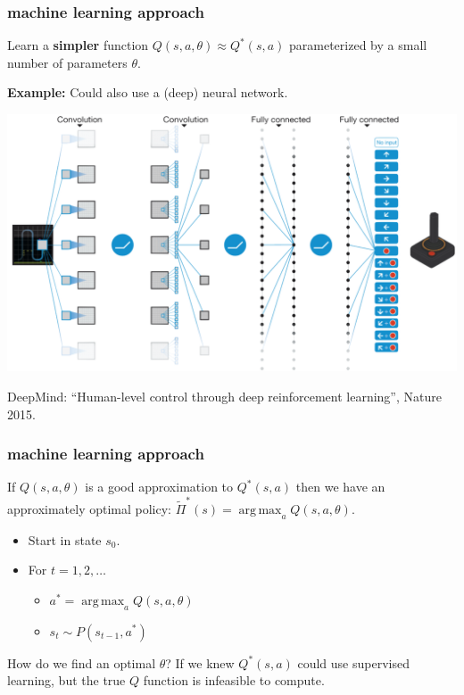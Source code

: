 \documentclass[handout,compress]{beamer}
\DeclareMathOperator*{\argmax}{arg\,max}
\begin{document}
\begin{frame}
	\frametitle{machine learning approach}
	Learn a \textbf{simpler} function $Q(s,a,{\theta}) \approx Q^*(s,a)$ parameterized by a small number of parameters ${\theta}$.  
	
	\textbf{Example:} Could also use a (deep) neural network. 
	\begin{center}
		\includegraphics[width=.7\textwidth]{atari_func_approx.png}
	\end{center}
DeepMind: ``Human-level control through deep reinforcement learning'', Nature 2015.
\end{frame}

\begin{frame}
	\frametitle{machine learning approach}
	If $Q(s,a,\theta)$ is a good approximation to $Q^*(s,a)$ then we have an approximately optimal policy: $\tilde{\Pi}^*(s) = \argmax_a Q(s,a, \theta)$.
	\begin{itemize}
		\item Start in state $s_0$. 
		\item For $t = 1, 2, \ldots$
		\begin{itemize}
			\item $a^* = \argmax_a Q(s,a, \theta)$
			\item $s_{t} \sim P(s_{t-1},a^*)$
		\end{itemize}
	\end{itemize}
\begin{center}
	How do we find an optimal $\theta$? If we knew $Q^*(s,a)$ could use supervised learning, but the true $Q$ function is infeasible to compute. 
\end{center}
	
\end{frame}
\end{document}
